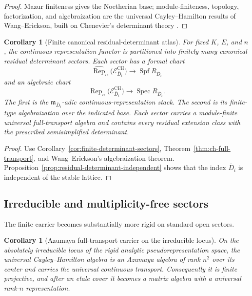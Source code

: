\documentclass[11pt]{article}
\newtheorem{corollary}[theorem]{Corollary}
\theoremstyle{definition}
\begin{document}
\begin{proof}
Mazur finiteness gives the Noetherian base; module-finiteness, topology, factorization, and algebraization are the universal Cayley--Hamilton results of Wang--Erickson, built on Chenevier's determinant theory \cite{WangEricksonFamilies,ChenevierDeterminants}.
\end{proof}

\begin{corollary}[Finite canonical residual-determinant atlas]\label{cor:ch-atlas}
For fixed $K$, $E$, and $n$, the continuous representation functor is partitioned into finitely many canonical residual determinant sectors.  Each sector has a formal chart
\[
\widehat{\operatorname{Rep}}_n
 \bigl(\mathcal E^{\mathrm{CH}}_{\bar D_i}\bigr)
 \longrightarrow \operatorname{Spf}R_{\bar D_i}
\]
and an algebraic chart
\[
\operatorname{Rep}_n
 \bigl(\mathcal E^{\mathrm{CH}}_{\bar D_i}\bigr)
 \longrightarrow \operatorname{Spec}R_{\bar D_i}.
\]
The first is the $\mathfrak m_{\bar D_i}$-adic continuous-representation stack.  The second is its finite-type algebraization over the indicated base.  Each sector carries a module-finite universal full-transport algebra and contains every residual extension class with the prescribed semisimplified determinant.
\end{corollary}

\begin{proof}
Use Corollary~\ref{cor:finite-determinant-sectors}, Theorem~\ref{thm:ch-full-transport}, and Wang--Erickson's algebraization theorem.  Proposition~\ref{prop:residual-determinant-independent} shows that the index $\bar D_i$ is independent of the stable lattice.
\end{proof}

\subsection{Irreducible and multiplicity-free sectors}

The finite carrier becomes substantially more rigid on standard open sectors.

\begin{corollary}[Azumaya full-transport carrier on the irreducible locus]\label{cor:ch-azumaya}
On the absolutely irreducible locus of the rigid analytic pseudorepresentation space, the universal Cayley--Hamilton algebra is an Azumaya algebra of rank $n^2$ over its center and carries the universal continuous transport.  Consequently it is finite projective, and after an etale cover it becomes a matrix algebra with a universal rank-$n$ representation.
\end{corollary}
\end{document}
